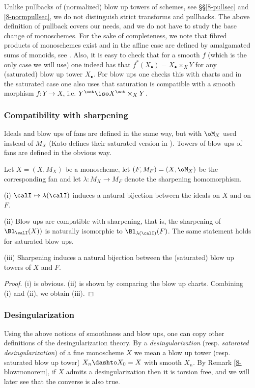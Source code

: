 \documentclass[10pt]{../fichiers-configuration-latex/smfart}
\begin{document}
\begin{remark2}\label{8-towpullrem} Unlike pullbacks of
(normalized) blow up towers of schemes, see \S\S\ref{8-pullsec}
and \ref{8-normpullsec}, we do not distinguish strict transforms
and pullbacks. The above definition of pullback covers our needs,
and we do not have to study the base change of monoschemes. For the
sake of completeness, we note that fibred products of monoschemes
exist and in the affine case are defined by amalgamated sums of
monoids, see \cite{Deitmar@F1}. Also, it is easy to check that for
a smooth $f$ (which is the only case we will use) one indeed has
that $f^*(X_\bullet)=X_\bullet\times_XY$ for any (saturated) blow up
tower $X_\bullet$. For blow ups one checks this with charts and in
the saturated case one also uses that saturation is compatible
with a smooth morphism $f{\colon}Y\to X$, i.e. $Y^\sat\iso
X^\sat\times_XY$.  \end{remark2}

\subsubsection{Compatibility with sharpening}\label{8-compsharpsec}
Ideals and blow ups of fans are defined in the same way, but with
$\oM_X$ used instead of ${M}_X$ (Kato defines their saturated version
in \cite[9.7]{Toric@Kato}). Towers of blow ups of fans are defined
in the obvious way.

\begin{lemma2}\label{8-idealfanlem} Let $X=(X,{M}_X)$ be a
monoscheme, let $(F,M_F)=(X,\oM_X)$ be the corresponding fan and
let $\lambda{\colon}M_X\to M_F$ denote the sharpening homomorphism.

(i) $\calI\mapsto\lambda(\calI)$ induces a natural bijection between
the ideals on $X$ and on $F$.

(ii) Blow ups are compatible with sharpening, that is,
the sharpening of $\Bl_\calI(X))$ is naturally isomorphic to
$\Bl_{\lambda(\calI)}(F)$. The same statement holds for saturated
blow ups.

(iii) Sharpening induces a natural bijection between the (saturated)
blow up towers of $X$ and $F$.  \end{lemma2} \begin{proof} (i) is
obvious. (ii) is shown by comparing the blow up charts. Combining
(i) and (ii), we obtain (iii).  \end{proof}

\subsubsection{Desingularization}\label{8-fandesingsec} Using
the above notions of smoothness and blow ups, one can copy
other definitions of the desingularization theory. By a {\em
desingularization} (resp. {\em saturated desingularization}) of
a fine monoscheme $X$ we mean a blow up tower (resp. saturated
blow up tower) $X_n\dashto X_0=X$ with smooth $X_n$. By Remark
\ref{8-blowmonorem}, if $X$ admits a desingularization then it is
torsion free, and we will later see that the converse is also true.
\end{document}
